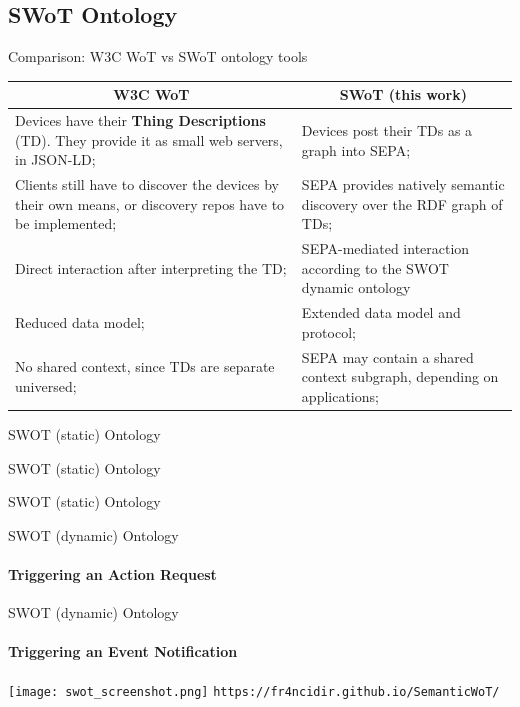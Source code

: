 \documentclass{beamer}
\begin{document}
\subsection{SWoT Ontology}
\begin{frame}{Comparison: W3C WoT vs SWoT ontology tools}
\small
\begin{tabular}{|p{}|p{}|}
\multicolumn{1}{c}{\textbf{W3C WoT}} & \multicolumn{1}{c}{\textbf{SWoT (this work)}} \\ \hline \hline
Devices have their \textbf{Thing Descriptions} (TD). They provide it as small web servers, in JSON-LD; & Devices post their TDs as a graph into SEPA; \\ \hline 
Clients still have to discover the devices by their own means, or discovery repos have to be implemented; & SEPA provides natively semantic discovery over the RDF graph of TDs; \\ \hline
Direct interaction after interpreting the TD; & SEPA-mediated interaction according to the  SWOT dynamic ontology \\ \hline
Reduced data model; & Extended data model and protocol; \\ \hline
No shared context, since TDs are separate universed; & SEPA may contain a shared context subgraph, depending on applications;\\ \hline \hline
\end{tabular}
\normalsize
\end{frame}

\begin{frame}{SWOT (static) Ontology}

\end{frame}
\begin{frame}{SWOT (static) Ontology}

\end{frame}
\begin{frame}{SWOT (static) Ontology}

\end{frame}

\begin{frame}{SWOT (dynamic) Ontology}
\framesubtitle{Triggering an Action Request}

\end{frame}
\begin{frame}{SWOT (dynamic) Ontology}
\framesubtitle{Triggering an Event Notification}

\end{frame}
\begin{frame}
\texttt{[image: swot\_screenshot.png]}
\texttt{https://fr4ncidir.github.io/SemanticWoT/}
\end{frame}
\end{document}

